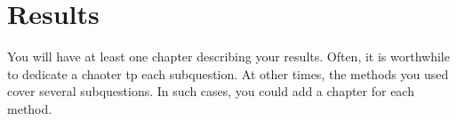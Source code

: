 \chapter{Results}
You will have at least one chapter describing your results. Often, it is worthwhile to dedicate a chaoter tp each subquestion. At other times, the methods you used cover several subquestions. In such cases, you could add a chapter for each method.